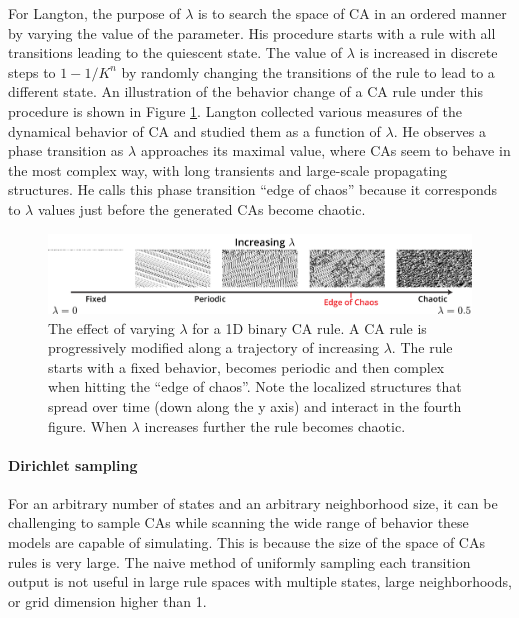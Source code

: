 For Langton, the purpose of $\lambda$ is to search the space of \ac{CA} in an ordered
manner by varying the value of the parameter. His procedure starts with a rule
with all transitions leading to the quiescent state. The value of $\lambda$ is
increased in discrete steps to $1 - 1 / K^{n}$ by randomly changing the
transitions of the rule to lead to a different state. An illustration of the
behavior change of a \ac{CA} rule under this procedure is shown in Figure
\ref{fig:langton_lambda}. Langton collected various measures of the dynamical
behavior of \ac{CA} and studied them as a function of $\lambda$. He observes a phase
transition as $\lambda$ approaches its maximal value, where \acp{CA} seem to behave
in the most complex way, with long transients and large-scale propagating
structures. He calls this phase transition ``edge of chaos'' because it
corresponds to $\lambda$ values just before the generated \acp{CA} become
chaotic.

\begin{figure}[htbp]
  \centering
  \includegraphics[width=\linewidth]{figures/langton_lambda.pdf}
  \caption{The effect of varying $\lambda$ for a 1D binary \ac{CA} rule. A \ac{CA}
    rule is progressively modified along a trajectory of increasing $\lambda$. The
    rule starts with a fixed behavior, becomes periodic and then complex when
    hitting the ``edge of chaos''. Note the localized structures that spread
    over time (down along the y axis) and interact in the fourth figure. When
    $\lambda$ increases further the rule becomes chaotic.}
  \label{fig:langton_lambda}
\end{figure}

\paragraph{Dirichlet sampling}
For an arbitrary number of states and an arbitrary neighborhood size, it can be
challenging to sample \acp{CA} while scanning the wide range of behavior these
models are capable of simulating. This is because the size of the space of
\acp{CA} rules is very large. The naive method of uniformly sampling each
transition output is not useful in large rule spaces with multiple states, large
neighborhoods, or grid dimension higher than 1.

